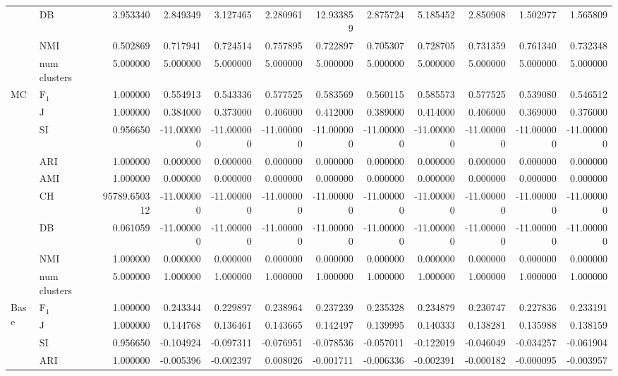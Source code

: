\begin{tabular}{llrrrrrrrrrr}
 & DB & 3.953340 & 2.849349 & 3.127465 & 2.280961 & 12.933859 & 2.875724 & 5.185452 & 2.850908 & 1.502977 & 1.565809 \\
 & NMI & 0.502869 & 0.717941 & 0.724514 & 0.757895 & 0.722897 & 0.705307 & 0.728705 & 0.731359 & 0.761340 & 0.732348 \\
 & num clusters & 5.000000 & 5.000000 & 5.000000 & 5.000000 & 5.000000 & 5.000000 & 5.000000 & 5.000000 & 5.000000 & 5.000000 \\
\multirow[c]{9}{*}{MC} & F$_1$ & 1.000000 & 0.554913 & 0.543336 & 0.577525 & 0.583569 & 0.560115 & 0.585573 & 0.577525 & 0.539080 & 0.546512 \\
 & J & 1.000000 & 0.384000 & 0.373000 & 0.406000 & 0.412000 & 0.389000 & 0.414000 & 0.406000 & 0.369000 & 0.376000 \\
 & SI & 0.956650 & -11.000000 & -11.000000 & -11.000000 & -11.000000 & -11.000000 & -11.000000 & -11.000000 & -11.000000 & -11.000000 \\
 & ARI & 1.000000 & 0.000000 & 0.000000 & 0.000000 & 0.000000 & 0.000000 & 0.000000 & 0.000000 & 0.000000 & 0.000000 \\
 & AMI & 1.000000 & 0.000000 & 0.000000 & 0.000000 & 0.000000 & 0.000000 & 0.000000 & 0.000000 & 0.000000 & 0.000000 \\
 & CH & 95789.650312 & -11.000000 & -11.000000 & -11.000000 & -11.000000 & -11.000000 & -11.000000 & -11.000000 & -11.000000 & -11.000000 \\
 & DB & 0.061059 & -11.000000 & -11.000000 & -11.000000 & -11.000000 & -11.000000 & -11.000000 & -11.000000 & -11.000000 & -11.000000 \\
 & NMI & 1.000000 & 0.000000 & 0.000000 & 0.000000 & 0.000000 & 0.000000 & 0.000000 & 0.000000 & 0.000000 & 0.000000 \\
 & num clusters & 5.000000 & 1.000000 & 1.000000 & 1.000000 & 1.000000 & 1.000000 & 1.000000 & 1.000000 & 1.000000 & 1.000000 \\
\multirow[c]{9}{*}{Base} & F$_1$ & 1.000000 & 0.243344 & 0.229897 & 0.238964 & 0.237239 & 0.235328 & 0.234879 & 0.230747 & 0.227836 & 0.233191 \\
 & J & 1.000000 & 0.144768 & 0.136461 & 0.143665 & 0.142497 & 0.139995 & 0.140333 & 0.138281 & 0.135988 & 0.138159 \\
 & SI & 0.956650 & -0.104924 & -0.097311 & -0.076951 & -0.078536 & -0.057011 & -0.122019 & -0.046049 & -0.034257 & -0.061904 \\
 & ARI & 1.000000 & -0.005396 & -0.002397 & 0.008026 & -0.001711 & -0.006336 & -0.002391 & -0.000182 & -0.000095 & -0.003957 \\

\end{tabular}
